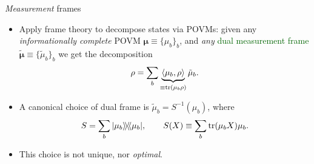 \documentclass{beamer}
\begin{document}
\begin{frame}{\textit{Measurement} frames}
    \begin{itemize}
        \item Apply frame theory to decompose states via POVMs:
        given any \textit{informationally complete} POVM $\boldsymbol\mu\equiv\{\mu_b\}_b$, and \textit{any} \textcolor{darkgreen}{dual measurement frame} $\tilde{\boldsymbol \mu}\equiv\{\tilde{ \mu}_b\}_b$ we get the decomposition
        \begin{equation*}
            \rho = \sum_b
            \underbrace{\langle \mu_b,\rho\rangle}_{\equiv\trace(\mu_b\rho)}
            \tilde\mu_b.
        \end{equation*}\pause
        \item A canonical choice of dual frame is $\tilde\mu_b = S^{-1}(\mu_b)$, where
        \begin{equation*}
            S = \sum_b |\mu_b\rangle\!\rangle\!\langle\!\langle \mu_b|,
            \qquad
            S(X) \equiv \sum_b \trace(\mu_b X)\mu_b.
        \end{equation*}\pause
        \item \colorbox{yellow!30}{This choice is not unique, nor \textit{optimal}}.
    \end{itemize}
\end{frame}
\end{document}
